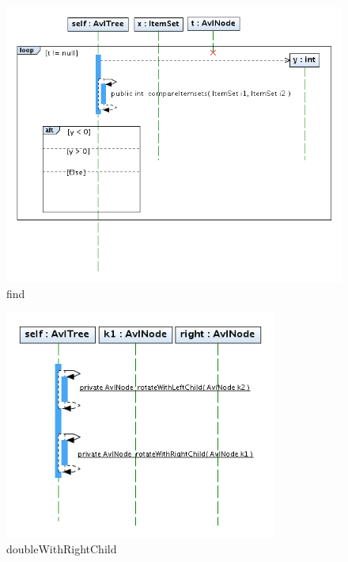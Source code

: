 \begin{figure}
\includegraphics[width=1.2\textwidth]{AvlTree/find.png}
\caption{find}
\end{figure}
\newpage


\begin{figure}
\centering
\includegraphics[width=0.8\textwidth]{AvlTree/doubleWithRightChild.png}
\caption{doubleWithRightChild}
\end{figure}
\newpage


